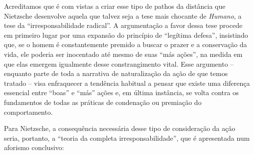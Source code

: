 \documentclass[
	12pt,				%
	openright,			%
	oneside,			%
	a4paper,			%
	english,			%
	french,				%
	spanish,			%
	brazil				%
	]{abntex2}
\begin{document}
Acreditamos que é com vistas a criar esse tipo de pathos da distância que Nietzsche desenvolve aquela que talvez seja a tese mais chocante de \textit{Humano}, a tese da “irresponsabilidade radical”. A argumentação a favor dessa tese procede em primeiro lugar por uma expansão do princípio de “legítima defesa”, insistindo que, se o homem é constantemente premido a buscar o prazer e a conservação da vida, ele poderia ser inocentado até mesmo de suas “más ações”, na medida em que elas emergem igualmente desse constrangimento vital. Esse argumento – enquanto parte de toda a narrativa de naturalização da ação de que temos tratado – visa enfraquecer a tendência habitual a pensar que existe uma diferença essencial entre “boas” e “más” ações e, em última instância, se volta contra os fundamentos de todas as práticas de condenação ou premiação do comportamento. 

	Para Nietzsche, a consequência necessária desse tipo de consideração da ação seria, portanto, a “teoria da completa irresponsabilidade”, que é apresentada num aforismo conclusivo: 
	
\end{document}

